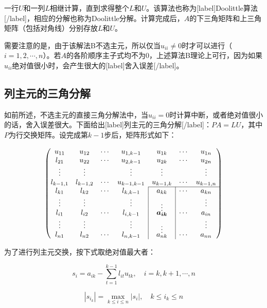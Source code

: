 \documentclass[UTF8,nofonts]{ctexart}
\begin{document}
一行$U$和一列$L$相继计算，直到求得整个$L$和$U$。该算法也称为[label]Doolittle算法[/label]，相应的分解也称为Doolittle分解。计算完成后，$A$的下三角矩阵和上三角矩阵（包括对角线）分别存放$L$和$U$。

需要注意的是，由于该解法B不选主元，所以仅当$u_{ii} \neq 0$时才可以进行（$i=1,2,\cdots,n$）。若$A$的各阶顺序主子式均不为$0$，上述算法B理论上可行，因为如果$u_{ii}$绝对值很小时，会产生很大的[label]舍入误差[/label]。

\subsection*{列主元的三角分解}

如前所述，不选主元的直接三角分解法中，当$u_{ii}=0$时计算中断，或者绝对值很小的话，舍入误差很大。下面给出[label]列主元的三角分解[/label]：$PA=LU$，其中$P$为行交换矩阵。设完成第$k-1$步后，矩阵形式如下：

\[
\begin{pmatrix}
u_{11} & u_{12} & \cdots & u_{1,k-1} & u_{1k} & \cdots & u_{1n} \\
l_{21} & u_{22} & \cdots & u_{2,k-1} & u_{2k} & \cdots & u_{2n} \\
\vdots & \vdots & & \vdots & \vdots & & \vdots \\
l_{k-1,1} & l_{k-1,2} & \cdots & u_{k-1,k-1} & u_{k-1,k} & \cdots & u_{k-1,n} \\
\cline{5-7}
l_{k1} & l_{k2} & \cdots & l_{k,k-1} & \multicolumn{1}{|c|}{\multirow{1}{*}{$a_{kk}$}} & \cdots & a_{kn} \\
\vdots & \vdots & & \vdots & \multicolumn{1}{|c|}{\multirow{1}{*}{\vdots}} & & \vdots \\
l_{i1} & l_{i2} & \cdots & l_{i,k-1} & \multicolumn{1}{|c|}{\multirow{1}{*}{$\boldsymbol{a_{ik}}$}} & \cdots & a_{in} \\
\vdots & \vdots & & \vdots & \multicolumn{1}{|c|}{\multirow{1}{*}{\vdots}} & & \vdots \\
l_{n1} & l_{n2} & \cdots & l_{n,k-1} & \multicolumn{1}{|c|}{\multirow{1}{*}{$a_{nk}$}} & \cdots & a_{nn} \\
\end{pmatrix}
\]

为了进行列主元交换，按下式取绝对值最大者：

\begin{equation}
\label{eq:si}
s_i=a_{ik}-\sum_{t=1}^{k-1}l_{it}u_{tk},\quad i=k,k+1,\cdots,n
\end{equation}

\begin{equation}
\label{eq:sk}
|s_{i_k}|=\max_{k \leq i \leq n}|s_i|,\quad k \leq i_k \leq n
\end{equation}
\end{document}
